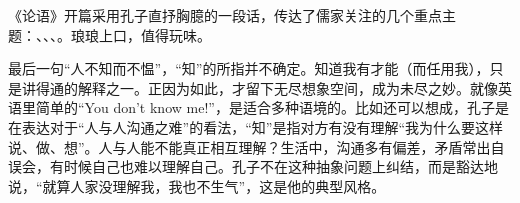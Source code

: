 {
《论语》开篇采用孔子直抒胸臆的一段话，传达了儒家关注的几个重点主题：、、、。琅琅上口，值得玩味。

最后一句“人不知而不愠”，“知”的所指并不确定。知道我有才能（而任用我），只是讲得通的解释之一。正因为如此，才留下无尽想象空间，成为未尽之妙。就像英语里简单的“You don't know me!”，是适合多种语境的。比如还可以想成，孔子是在表达对于“人与人沟通之难”的看法，“知”是指对方有没有理解“我为什么要这样说、做、想”。人与人能不能真正相互理解？生活中，沟通多有偏差，矛盾常出自误会，有时候自己也难以理解自己。孔子不在这种抽象问题上纠结，而是豁达地说，“就算人家没理解我，我也不生气”，这是他的典型风格。
}

